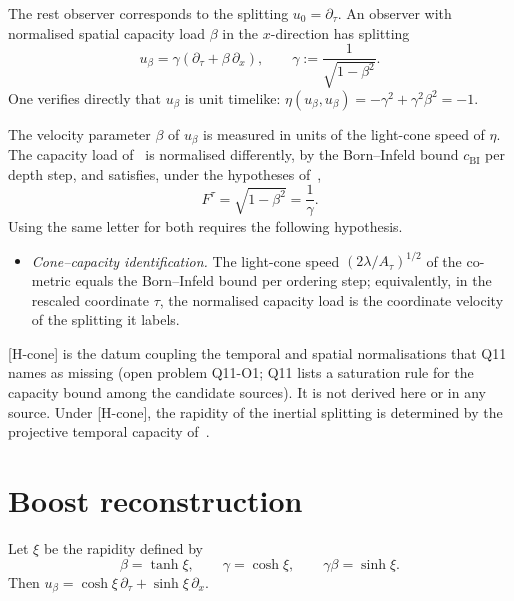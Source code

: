 \documentclass[12pt,a4paper]{article}
\theoremstyle{remark}
\theoremstyle{definition}
\begin{document}
    The rest observer corresponds to the splitting $u_0 = \partial_\tau$.
    An observer with normalised spatial capacity load $\beta$ in the $x$-direction has
    splitting
    \[
      u_\beta = \gamma(\partial_\tau + \beta\,\partial_x),
      \qquad
      \gamma := \frac{1}{\sqrt{1-\beta^2}}.
    \]
    One verifies directly that $u_\beta$ is unit timelike:
    $\eta(u_\beta, u_\beta) = -\gamma^2 + \gamma^2\beta^2 = -1$.

    The velocity parameter $\beta$ of $u_\beta$ is measured in units of the light-cone speed of $\eta$.
    The capacity load of~\cite{Beau2026n,Beau2026tp} is normalised differently, by the Born--Infeld bound
    $c_{\mathrm{BI}}$ per depth step, and satisfies, under the hypotheses of~\cite{Beau2026tp},
    \[
      F^\tau = \sqrt{1-\beta^2} = \frac{1}{\gamma}.
    \]
    Using the same letter for both requires the following hypothesis.
    \begin{itemize}
      \item[{[H-cone]}] \emph{Cone--capacity identification.}
      The light-cone speed $(2\lambda/A_\tau)^{1/2}$ of the co-metric equals the Born--Infeld bound per ordering
      step; equivalently, in the rescaled coordinate $\tau$, the normalised capacity load is the coordinate
      velocity of the splitting it labels.
    \end{itemize}
    [H-cone] is the datum coupling the temporal and spatial normalisations that Q11 names as missing (open problem
    Q11-O1; Q11 lists a saturation rule for the capacity bound among the candidate sources).
    It is not derived here or in any source.
    Under [H-cone], the rapidity of the inertial splitting is determined by the projective temporal capacity
    of~\cite{Beau2026tp}.

  \section{Boost reconstruction}
    \label{sec:boost}

    Let $\xi$ be the rapidity defined by
    \[
      \beta = \tanh\xi, \qquad \gamma = \cosh\xi, \qquad \gamma\beta = \sinh\xi.
    \]
    Then $u_\beta = \cosh\xi\,\partial_\tau + \sinh\xi\,\partial_x$.
\end{document}
